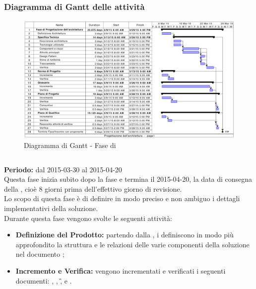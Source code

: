 \subsubsection{Diagramma di Gantt delle attività}
\begin{figure}[h]
\centering
\includegraphics[width=\textwidth,keepaspectratio]{../immagini/gantt/progettazioneArchitetturaP.png}
\caption{Diagramma di Gantt - Fase di \fPAt}\label{fig:ganttFPA}
\end{figure}
\FloatBarrier
\subsection{\fPDt}\label{progComponenti}
\textbf{Periodo:} dal 2015-03-30 al 2015-04-20 \\
Questa fase inizia subito dopo la fase \fPA e termina il 2015-04-20, la data di consegna della \RP, cioè 8 giorni prima dell'effettivo giorno di revisione.\\
Lo scopo di questa fase è di definire in modo preciso e non ambiguo i dettagli implementativi della soluzione. \\
Durante questa fase vengono svolte le seguenti attività:
\begin{itemize}
\item \textbf{Definizione del Prodotto:} partendo dalla \ST, i \rPs definiscono in modo più approfondito la struttura e le relazioni delle varie componenti della soluzione nel documento \DP;
\item \textbf{Incremento e Verifica:} vengono incrementati e verificati i seguenti documenti: \ST, \NP, \G, \PP e \PQ.
\end{itemize}
\newpage
